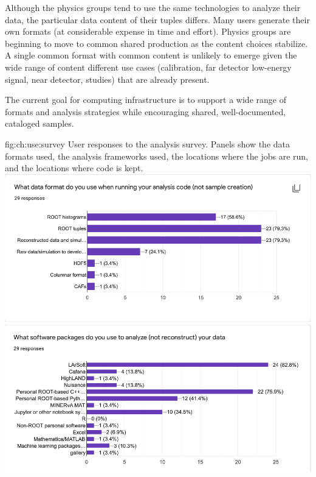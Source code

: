 \documentclass[../main-v1.tex]{subfiles}
\begin{document}
Although the physics groups tend to use the same technologies to analyze their data, the particular data content of their tuples differs.  Many users generate their own formats (at considerable expense in time and effort). Physics groups are beginning to move to common shared production as the content choices stabilize.  A single common format with common content is unlikely to emerge given the wide range of content different use cases (calibration, far detector low-energy signal, near detector,  studies) that are already present.

The current goal for computing infrastructure is to support a wide range of formats and analysis strategies while encouraging shared, well-documented, cataloged samples. 

\begin{dunefigure}
{fig:ch:use:survey}
 {User responses to the analysis survey. Panels show the data formats used, the analysis frameworks used, the locations where the jobs are run, and the locations where code is kept.}
\includegraphics[width=6 in]{graphics/Algo/SurveyFormat.png}
\includegraphics[width=6 in]{graphics/Algo/SurveyCode.png}
\end{dunefigure}
\end{document}
